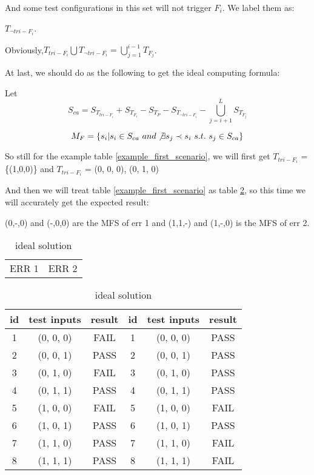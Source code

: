\documentclass{sig-alternate}
\begin{document}
And some test configurations in this set will not trigger $F_{i}$. We label them as:

$ T_{\neg tri-F_{i}}$.

Obviously,$ T_{tri-F_{i}}\bigcup T_{\neg tri-F_{i}} = \bigcup_{j = 1}^{i-1}T_{F_{j}}$.


At last, we should do as the following to get the ideal computing formula:


Let $$S_{ca} = S_{T_{tri-F_{i}}} + S_{T_{F_{i}}} - S_{T_{P}} -  S_{T_{\neg tri-F_{i}}} - \bigcup_{j = i+1}^{L}S_{T_{F_{j}}} $$

$$M_{F} = \{s_{i} | s_{i} \in S_{ca}\ and \not\exists s_{j} \prec s_{i}\ s.t.\ s_{j} \in S_{ca} \}$$

So still for the example table \ref{example_first_scenario}, we will first get
$ T_{tri-F_{i}}$ = \{(1,0,0)\} and $ T_{tri-F_{i}}$ = { (0, 0, 0), (0, 1, 0)}

And then we will treat table \ref{example_first_scenario} as table \ref{ideal_solution}, so this time we will accurately get the expected result:

(0,-,0) and (-,0,0) are the MFS of err 1 and (1,1,-) and (1,-,0) is the MFS of err 2.

\begin{table}
\centering
\caption{ideal solution}
\label{ideal_solution}
\begin{tabular}{p{}|p{}} \hline
   ERR 1 & ERR 2
\end{tabular}

\begin{tabular}{c|c|c|c|c|c} \hline
id &test inputs & result & id&test inputs & result\\ \hline
1 &(0, 0, 0) &  FAIL &1&(0, 0, 0) &  PASS\\ \hline
2 &(0, 0, 1) &  PASS &2&(0, 0, 1) &  PASS\\ \hline
3 &(0, 1, 0) &  FAIL &3&(0, 1, 0) &  PASS\\ \hline
4 &(0, 1, 1) &  PASS &4&(0, 1, 1) &  PASS\\ \hline
5 &(1, 0, 0) &  FAIL &5&(1, 0, 0) &  FAIL\\ \hline
6 &(1, 0, 1) &  PASS &6&(1, 0, 1) &  PASS\\ \hline
7 &(1, 1, 0) &  PASS &7&(1, 1, 0) &  FAIL\\ \hline
8 &(1, 1, 1) &  PASS &8&(1, 1, 1) &  FAIL\\ \hline
\hline\end{tabular}
\end{table}
\end{document}
